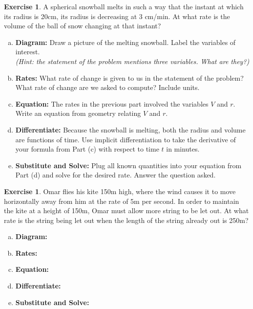 \documentclass[11pt,reqno,final]{amsart}
\numberwithin{figure}{section}
\theoremstyle{definition} %
\newtheorem{exercise}[question]{Exercise}
\begin{document}
\newpage


\begin{exercise}
        A spherical snowball melts in such a way that the instant at which its radius is 20cm, its radius is decreasing at 3 cm/min.
        At what rate is the volume of the ball of snow changing at that instant?
        \begin{enumerate}[(a)]
        \item \textbf{Diagram:} Draw a picture of the melting snowball. Label the variables of interest.\\
                \textit{(Hint: the statement of the problem mentions three variables. What are they?)}
                \vfill
                \vfill
        \item \textbf{Rates:} What rate of change is given to us in the statement of the problem?
                What rate of change are we asked to compute?
                Include units.
                \vfill
        \item \textbf{Equation:} The rates in the previous part involved the variables $V$ and $r$.
                Write an equation from geometry relating $V$ and $r$.
                \vfill
        \item \textbf{Differentiate:} Because the snowball is melting, both the radius and volume are functions of time.
                Use implicit differentiation to take the derivative of your formula from Part (c) with respect to time $t$ in minutes.
                \vfill
        \item \textbf{Substitute and Solve:} Plug all known quantities into your equation from Part (d) and solve for the desired rate.
                Answer the question asked.
                \vfill
        \end{enumerate}
\end{exercise}

\newpage


\begin{exercise}
        Omar flies his kite 150m high, where the wind causes it to move horizontally away from him at the rate of 5m per second.
        In order to maintain the kite at a height of 150m, Omar must allow more string to be let out.
        At what rate is the string being let out when the length of the string already out is 250m?
        \begin{enumerate}[(a)]
        \item \textbf{Diagram:}
                \vfill
                \vfill
        \item \textbf{Rates:}
                \vfill
        \item \textbf{Equation:}
                \vfill
        \item \textbf{Differentiate:}
                \vfill
        \item \textbf{Substitute and Solve:}
                \vfill
        \end{enumerate}
\end{exercise}
\end{document}
